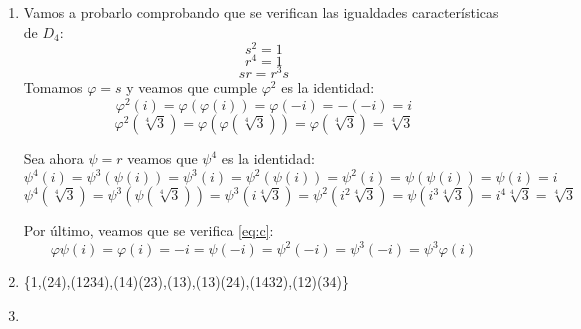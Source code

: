 \documentclass[a4paper]{article}
\begin{document}
\begin{enumerate}
\item Vamos a probarlo comprobando que se verifican las igualdades características de $D_{4}$:
\begin{equation}\label{eq:a}
s^2=1
\end{equation}
\begin{equation}\label{eq:b}
r^4=1
\end{equation}
\begin{equation}\label{eq:c}
sr=r^{3}s
\end{equation}
Tomamos $\varphi = s$ y veamos que cumple $\varphi^{2}$ es la identidad:
\begin{equation*}
\varphi^{2}(i)=\varphi(\varphi(i))=\varphi(-i)=-(-i)=i
\end{equation*}
\begin{equation*}
\varphi^{2}(\sqrt[4]{3})=\varphi(\varphi(\sqrt[4]{3}))=\varphi(\sqrt[4]{3})=\sqrt[4]{3}
\end{equation*}

Sea ahora $\psi = r$ veamos que $\psi^{4}$ es la identidad:
\begin{equation*}
\psi^{4}(i)=\psi^{3}(\psi(i))=\psi^{3}(i)=\psi^{2}(\psi(i))=\psi^{2}(i)=\psi(\psi(i))=\psi(i)=i
\end{equation*}
\begin{equation*}
\psi^{4}(\sqrt[4]{3})=\psi^{3}(\psi(\sqrt[4]{3}))=\psi^{3}(i\sqrt[4]{3})=\psi^{2}(i^{2}\sqrt[4]{3})=\psi(i^{3}\sqrt[4]{3})=i^{4}\sqrt[4]{3}=\sqrt[4]{3}
\end{equation*}

Por último, veamos que se verifica \ref{eq:c}:
\begin{equation*}
\varphi\psi(i)=\varphi(i)=-i=\psi(-i)=\psi^{2}(-i)=\psi^{3}(-i)=\psi^{3}\varphi(i)
\end{equation*}

\item \{1,(24),(1234),(14)(23),(13),(13)(24),(1432),(12)(34)\}
\

\item
\


\end{enumerate}
\end{document}
